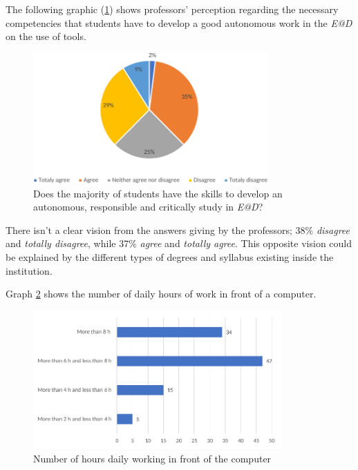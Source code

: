 \documentclass[english]{textolivre}
\begin{document}
The following graphic (\ref{fig5}) shows professors' perception regarding the necessary competencies that students have to develop a good autonomous work in the \emph{E@D} on the use of tools.

\begin{figure}[h!]
 \centering
 \includegraphics[width=0.8\textwidth]{Fig_005.pdf}
 \caption{Does the majority of students have the skills to develop an autonomous, responsible and critically study in \emph{E@D}?}
 \label{fig5}
\end{figure}

There isn't a clear vision from the answers giving by the professors; 38\% \emph{disagree} and \emph{totally disagree}, while 37\% \emph{agree} and \emph{totally agree}. This opposite vision could be explained by the different types of degrees and syllabus existing inside the institution. 

Graph \ref{fig6} shows the number of daily hours of work in front of a computer.

\begin{figure}[h!]
 \centering
 \includegraphics[width=0.85\textwidth]{Fig_006.pdf}
 \caption{Number of hours daily working in front of the computer}
 \label{fig6}
\end{figure}
\end{document}

